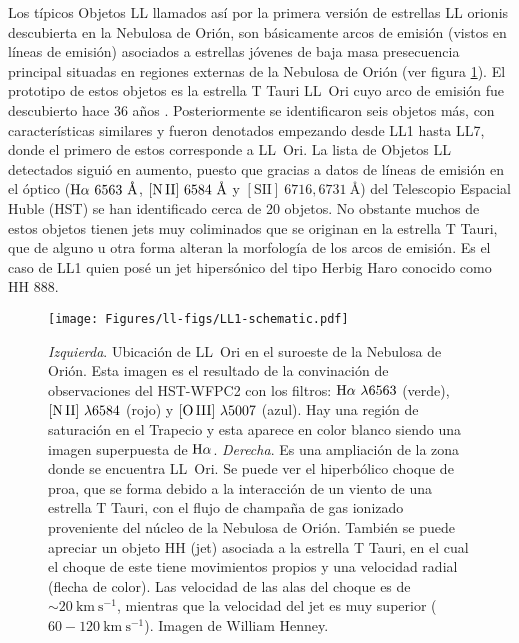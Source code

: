 Los típicos Objetos LL llamados así por la primera versión de estrellas LL orionis descubierta en la Nebulosa de Orión, son  básicamente arcos de emisión (vistos en líneas de emisión) asociados a estrellas jóvenes de baja masa presecuencia principal situadas en regiones externas de la Nebulosa de Orión \citep{Henney:2013a} (ver figura \ref{fig:LL1}). El prototipo de estos objetos es la estrella T Tauri LL~Ori cuyo arco de emisión fue descubierto hace 36 años \citep{Gull:1979a}. Posteriormente se identificaron seis objetos más, con características similares \citep{Bally:2001a} y fueron denotados empezando desde LL1 hasta LL7, donde el primero de estos corresponde a LL~Ori. La lista de Objetos LL detectados siguió en aumento, puesto que gracias a datos de líneas de emisión en el óptico (\(\mathrm{H}\alpha~6563~\text{\AA{}}\), \(\mathrm{[N\,II]}~6584~\text{\AA{}}\) y \([\text{SII}]~6716,6731~\text{\AA{}}\)) del Telescopio Espacial Huble (HST) \citep{Bally:2000a, Bally:2006a} se han identificado cerca de 20 objetos. No obstante muchos de estos objetos tienen jets muy coliminados que se originan en la estrella T Tauri, que de alguno u otra forma alteran la morfología de los arcos de emisión. Es el caso de LL1 quien posé un jet hipersónico del tipo Herbig Haro conocido como HH 888.\\

\begin{figure}
  \centering
  \texttt{[image: Figures/ll-figs/LL1-schematic.pdf]}
  \caption{\textit{Izquierda}. Ubicación de LL~Ori en el suroeste de la Nebulosa de Orión. Esta imagen es el resultado de la convinación de observaciones del HST-WFPC2 \citep{Odell:1996} con los filtros: \(\mathrm{H}\alpha~\lambda6563\) (verde), \(\mathrm{[N\,II]}~\lambda6584\) (rojo) y \(\mathrm{[O\,III]}~\lambda5007\) (azul). Hay una región de saturación en el Trapecio y esta aparece en color blanco siendo una imagen superpuesta de \(\mathrm{H}\alpha\). \textit{Derecha}. Es una ampliación de la zona donde se encuentra LL~Ori. Se puede ver el hiperbólico choque de proa, que se forma debido a la interacción de un viento de una estrella T Tauri, con  el flujo de champaña de gas ionizado  proveniente del núcleo de la Nebulosa de Orión. También se puede apreciar un objeto HH (jet) asociada a la  estrella T Tauri, en  el cual el choque de este tiene movimientos propios \citep{Henney:2013a} y una velocidad radial (flecha de color). Las velocidad de las alas del choque es de \(\sim 20 ~\text{km}~\text{s}^{-1}\), mientras que la velocidad del jet es muy superior (\(60-120 ~\text{km}~\text{s}^{-1}\)). Imagen de William Henney.}
  \label{fig:LL1}
\end{figure}

